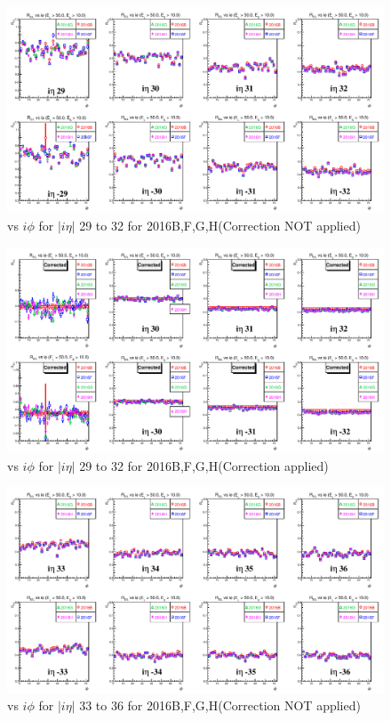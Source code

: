 \clearpage
\begin{figure}[h!]
\centering
\includegraphics[width=0.99\linewidth]{../Figures/Chap2/ImageFiles_HF/Ratio/2016/Corrected/ieta29_32_E1E2Cut3Ietaiphi}
\caption{\ratiosl vs $i\phi$ for $|i\eta|$ 29 to 32 for 2016B,F,G,H(Correction NOT applied)}
\label{fig:ieta29_32_E1E2Cut3Ietaiphi}
\end{figure}
\begin{figure}[h!]
\centering
\includegraphics[width=0.99\linewidth]{../Figures/Chap2/ImageFiles_HF/Ratio/2016/Corrected/ieta29_32_E1E2Cut3Ietaiphi_Crrtd}
\caption{\ratiosl vs $i\phi$ for $|i\eta|$ 29 to 32 for 2016B,F,G,H(Correction applied)}
\label{fig:ieta29_32_E1E2Cut3Ietaiphi_Crrtd}
\end{figure}
\newpage
\begin{figure}[h!]
\centering
\includegraphics[width=0.99\linewidth]{../Figures/Chap2/ImageFiles_HF/Ratio/2016/Corrected/ieta33_36_E1E2Cut3Ietaiphi}
\caption{\ratiosl vs $i\phi$ for $|i\eta|$ 33 to 36 for 2016B,F,G,H(Correction NOT applied)}
\label{fig:ieta33_36_E1E2Cut3Ietaiphi}
\end{figure}
